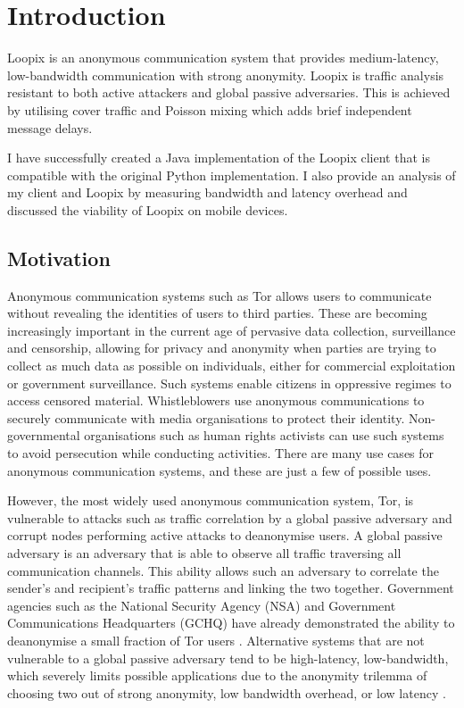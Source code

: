 \documentclass[final,dissertation.tex]{subfiles}
\begin{document}
\chapter{Introduction}

Loopix \cite{piotrowska2017loopix} is an anonymous communication system that provides medium-latency, low-bandwidth communication with strong anonymity. Loopix is traffic analysis resistant to both active attackers and global passive adversaries. This is achieved by utilising cover traffic and Poisson mixing which adds brief independent message delays.

I have successfully created a Java implementation of the Loopix client that is compatible with the original Python implementation. I also provide an analysis of my client and Loopix by measuring bandwidth and latency overhead and discussed the viability of Loopix on mobile devices.

\section{Motivation}


Anonymous communication systems such as Tor \cite{dingledine2004tor} allows users to communicate without revealing the identities of users to third parties. These are becoming increasingly important in the current age of pervasive data collection, surveillance and censorship, allowing for privacy and anonymity when parties are trying to collect as much data as possible on individuals, either for commercial exploitation or government surveillance. Such systems enable citizens in oppressive regimes to access censored material. Whistleblowers use anonymous communications to securely communicate with media organisations to protect their identity. Non-governmental organisations such as human rights activists can use such systems to avoid persecution while conducting activities. There are many use cases for anonymous communication systems, and these are just a few of possible uses.

However, the most widely used anonymous communication system, Tor, is vulnerable to attacks such as traffic correlation by a global passive adversary and corrupt nodes performing active attacks to deanonymise users. A global passive adversary is an adversary that is able to observe all traffic traversing all communication channels. This ability allows such an adversary to correlate the sender's and recipient's traffic patterns and linking the two together. Government agencies such as the National Security Agency (NSA) and Government Communications Headquarters (GCHQ) have already demonstrated the ability to deanonymise a small fraction of Tor users \cite{torstinks}. Alternative systems that are not vulnerable to a global passive adversary tend to be high-latency, low-bandwidth, which severely limits possible applications due to the anonymity trilemma of choosing two out of strong anonymity, low bandwidth overhead, or low latency \cite{das2017anonymity}.
\end{document}

